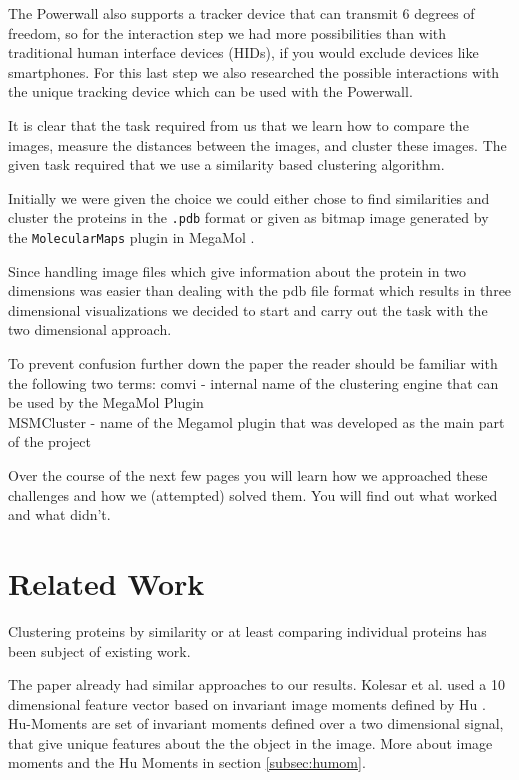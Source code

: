 \documentclass[journal]{vgtc}       %
\begin{document}
The Powerwall also supports a tracker device that can transmit 6 degrees of freedom, so for the interaction step we had more possibilities than with  traditional human interface  devices  (HIDs), if you would exclude devices like smartphones. For this last step we also researched the possible interactions with the unique tracking device  which can be used  with the  Powerwall.

It is clear that the task required from us that we learn how to compare the images, measure the distances between the images, and cluster these images.
The given task required that we use a similarity based clustering algorithm.

Initially we were given the choice we could either chose to find similarities and cluster the proteins in the \verb|.pdb| format or given as bitmap image generated by the \verb|MolecularMaps| plugin in MegaMol \cite{molecularmaps}.

Since handling image files which give information about the protein in two dimensions was easier than dealing with the pdb file format which results in three dimensional visualizations we decided to start and carry out the task with the two dimensional approach.

To prevent confusion further down the paper  the reader should be familiar with the following two terms: comvi - internal name of the clustering engine that can be used by the MegaMol Plugin \\
MSMCluster - name of the Megamol plugin that was developed as the main part of the project 

Over the course of the next few pages you will learn how we approached these challenges and how we (attempted) solved them. You will find out what  worked and what didn't.

\section{Related Work}\label{sec:relatedWork}

Clustering proteins by similarity or at least comparing individual proteins has been subject of existing work.

The paper \cite{kolesar} already had similar approaches to our results. Kolesar et al. used a 10 dimensional feature vector based on invariant image moments defined by Hu \cite{humoments}. Hu-Moments are set of invariant moments defined over a two dimensional signal, that give unique features about the the object in the image. More about image moments and the Hu Moments in section \ref{subsec:humom}.
\end{document}
